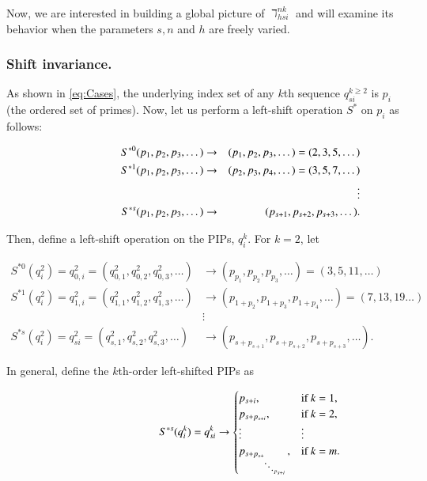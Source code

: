 \documentclass[12pt,longtitle,times]{amsart}
\begin{document}
Now, we are interested in building a global picture of $\daleth_{hsi}^{nk}$ and will examine its behavior when the parameters $s, n$ and $h$ are freely varied.

\subsubsection[short]{Shift invariance.} As shown in \eqref{eq:Cases}, the underlying index set of any $k$th sequence $q_{si}^{k\geq{2}}$ is $p_i$ (the ordered set of primes). Now, let us perform a left-shift operation $S^{\ast{}}$ on $p_i$ as follows:

\begin{singlespace}
\begin{eqnarray}
\hphantom{--------}\nonumber{}S^{\ast{}0}(p_1,p_2,p_3,\dots)&\rightarrow&(p_1,p_2,p_3,\dots)=(2,3,5,\dots)\\
\nonumber{}S^{\ast{}1}(p_1,p_2,p_3,\dots)&\rightarrow&(p_2,p_3,p_4,\dots)=(3,5,7,\dots)\\
\nonumber{}&&\vdots{}\\
\nonumber{}S^{\ast{}s}(p_1,p_2,p_3,\dots)&\rightarrow&(p_{s+1},p_{s+2},p_{s+3},\dots).
\end{eqnarray}
\end{singlespace}

Then, define a left-shift operation on the PIPs, $q_i^k$. For $k=2$, let

\begin{singlespace}
\begin{align*}
\nonumber{}S^{\ast{}0}(q_i^2)=q_{0,i}^2=(q_{0,1}^2,q_{0,2}^2,q_{0,3}^2,\dots)
   &\rightarrow(p_{p_1},p_{p_2},p_{p_3},\dots)=(3,5,11,\dots)\\
\nonumber{}S^{\ast{}1}(q_i^2)=q_{1,i}^2=(q_{1,1}^2,q_{1,2}^2,q_{1,3}^2,\dots)
   &\rightarrow(p_{1+p_{2}},p_{1+p_{3}},p_{1+p_{4}},\dots)=(7,13,19\dots{})\\
\nonumber{}&\vdots{}\\
\nonumber{}S^{\ast{}s}(q_i^2)=q_{si}^2=(q_{s,1}^2,q_{s,2}^2,q_{s,3}^2,\dots)
   &\rightarrow(p_{s+p_{s+1}},p_{s+p_{s+2}},p_{s+p_{s+3}},\dots).
\end{align*}
\end{singlespace}

In general, define the $k$th-order left-shifted PIPs as

\begin{singlespace}
\begin{equation}\label{eq:q_i cases shifted}
 \hphantom{----------}S^{\ast{}s}(q_i^k)=q_{si}^k\rightarrow
\begin{cases}
    p_{s+i},             & \text{if } k = 1,\\
    p_{s+p_{s+i}},         & \text{if } k = 2,\\
    \vdots          & \vdots\\
    p_{s+p_{s+_{\ddots_{p_{s+i}}}}},   & \text{if } k = m.                 
\end{cases} 
\end{equation}
\end{singlespace}
\end{document}
